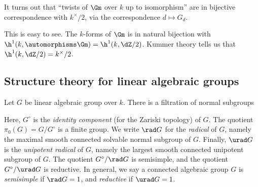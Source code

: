 It turns out that ``twists of $\Gm$ over $k$ up to isomorphism'' are in 
bijective correspondence with $k^\times/2$, via the correspondence 
$d\mapsto G_d$. 

\begin{hard}
This is easy to see. The $k$-forms of $\Gm$ is in natural bijection with
$\h^1(k,\automorphisms \Gm)=\h^1(k,\dZ/2)$. Kummer theory tells us that 
$\h^1(k,\dZ/2)=k^\times/2$. 
\end{hard}





\subsection{Structure theory for linear algebraic groups}\label{sec:str-thry-lag}

Let $G$ be linear algebraic group over $k$. There is a filtration of normal 
subgroups 
\begin{center}
\end{center}

Here, $G^\circ$ is the \emph{identity component} (for the Zariski topology) of 
$G$. The quotient $\pi_0(G)=G/G^\circ$ is a finite group. We write 
$\rad G$ for the \emph{radical} of $G$, namely the maximal smooth connected 
solvable normal subgroup of $G$. Finally, $\urad G$ is the \emph{unipotent 
radical} of $G$, namely the largest smooth connected unipotent subgroup of 
$G$. The quotient $G^\circ/\rad G$ is semisimple, and the quotient 
$G^\circ/\urad G$ is reductive. In general, we say a connected algebraic 
group $G$ is \emph{semisimple} if $\rad G=1$, and \emph{reductive} if 
$\urad G=1$. 

